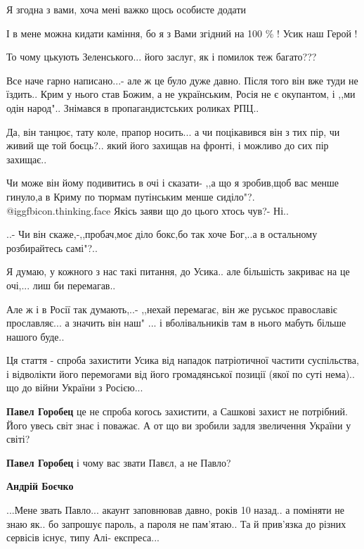 \begin{itemize}
Я згодна з вами, хоча мені важко щось особисте додати

І в мене можна кидати каміння, бо я з Вами згідний на 100 \% ! Усик наш Герой !

То чому цькують Зеленського... його заслуг, як і помилок теж багато???


Все наче гарно написано...- але ж це було дуже давно. Після того він вже туди
не їздить.. Крим у нього став Божим, а не українським, Росія не є окупантом, і
,,ми одін народ".. Знімався в пропагандистських роликах РПЦ..

Да, він танцює, тату коле, прапор носить... а чи поцікавився він з тих пір, чи живий
ще той боєць?.. який його захищав на фронті, і можливо до сих пір захищає..

Чи може він йому подивитись в очі і сказати- ,,а що я зробив,щоб вас менше
гинуло,а в Криму по тюрмам путінським менше сиділо"?. @igg{fbicon.thinking.face} Якісь заяви що до цього
хтось чув?- Ні..

..- Чи він скаже,-,,пробач,моє діло бокс,бо так хоче Бог,..а в остальному розбирайтесь самі"?..

Я думаю, у кожного з нас такі питання, до Усика.. але більшість закриває на це очі,... лиш би перемагав..

Але ж і в Росії так думають,..- ,,нехай перемагає, він же руськоє православіє
прославляє... а значить він наш" ... і вболівальників там в нього мабуть більше
нашого буде..

Ця стаття - спроба захистити Усика від нападок патріотичної частити
суспільства, і відволікти його перемогами від його громадянської позиції (якої
по суті нема).. що до війни України з Росією...

\begin{itemize} %
\textbf{Павел Горобец} це не спроба когось захистити, а Сашкові захист не потрібний. Його увесь світ знає і поважає. А от що ви зробили задля звеличення України у світі?


\textbf{Павел Горобец} і чому вас звати Павєл, а не Павло?

\textbf{Андрій Боєчко} 

...Мене звать Павло... акаунт заповнював давно, років 10 назад.. а поміняти не
знаю як.. бо запрошує пароль, а пароля не пам'ятаю.. Та й прив'язка до різних
сервісів існує, типу Алі- експреса...


\end{itemize}
\end{itemize}
